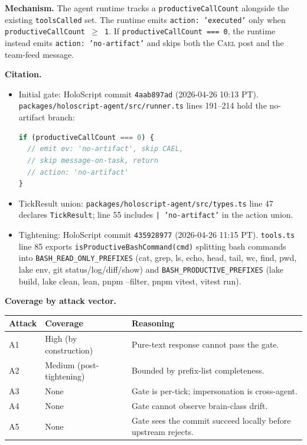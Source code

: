 \documentclass[letterpaper,twocolumn,10pt]{article}
\newcommand{\cael}{\textsc{Cael}}
\newcommand{\holoscript}{HoloScript}
\begin{document}
\textbf{Mechanism.} The agent runtime tracks a
\texttt{productiveCallCount} alongside the existing
\texttt{toolsCalled} set. The runtime emits \texttt{action:
'executed'} only when \texttt{productiveCallCount $\geq$ 1}. If
\texttt{productiveCallCount === 0}, the runtime instead emits
\texttt{action: 'no-artifact'} and skips both the \cael{} post and
the team-feed message.

\textbf{Citation.}
\begin{itemize}[topsep=2pt,itemsep=1pt]
\item Initial gate: \holoscript{} commit \texttt{4aab897ad}
(2026-04-26 10:13 PT). \texttt{packages/holoscript-agent/src/runner.ts}
lines 191--214 hold the no-artifact branch:
\begin{lstlisting}[language=TypeScript,numbers=none]
if (productiveCallCount === 0) {
  // emit ev: 'no-artifact', skip CAEL,
  // skip message-on-task, return
  // action: 'no-artifact'
}
\end{lstlisting}
\item TickResult union: \texttt{packages/holoscript-agent/src/types.ts}
line 47 declares \texttt{TickResult}; line 55 includes
\texttt{| 'no-artifact'} in the action union.
\item Tightening: \holoscript{} commit \texttt{435928977}
(2026-04-26 11:15 PT). \texttt{tools.ts} line 85 exports
\texttt{isProductiveBashCommand(cmd)} splitting bash commands
into \texttt{BASH\_READ\_ONLY\_PREFIXES} (cat, grep, ls, echo,
head, tail, wc, find, pwd, lake env, git status/log/diff/show)
and \texttt{BASH\_PRODUCTIVE\_PREFIXES} (lake build, lake clean,
lean, pnpm --filter, pnpm vitest, vitest run).
\end{itemize}

\textbf{Coverage by attack vector.}
\begin{center}\begin{tabular}{lll}
\toprule
Attack & Coverage & Reasoning \\
\midrule
A1 & High (by construction) & Pure-text response cannot pass the gate. \\
A2 & Medium (post-tightening) & Bounded by prefix-list completeness. \\
A3 & None & Gate is per-tick; impersonation is cross-agent. \\
A4 & None & Gate cannot observe brain-class drift. \\
A5 & None & Gate sees the commit succeed locally before upstream rejects. \\
\bottomrule
\end{tabular}\end{center}
\end{document}
